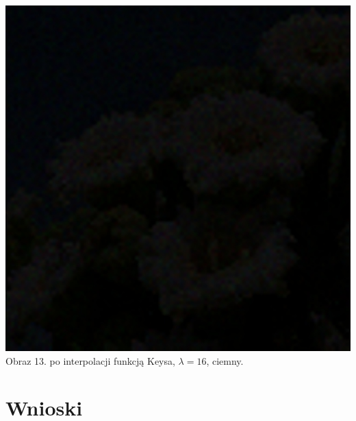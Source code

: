 \documentclass[14pt]{article}
\begin{document}
\begin{center}
    \vspace{0.5cm}
    \includegraphics[scale=0.15]{images/Poisson_keys_dark_16x.jpg}
    \\ \small Obraz 13. po interpolacji funkcją Keysa, 
    $\lambda = 16$, ciemny.

    \vspace{1.5cm}
\end{center}

\newpage
\section{Wnioski}
\end{document}
